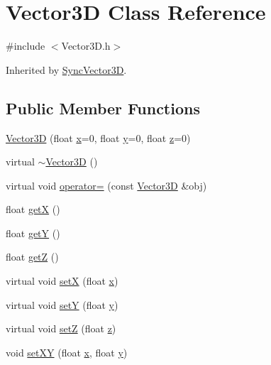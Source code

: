 \hypertarget{class_vector3_d}{}\section{Vector3\+D Class Reference}
\label{class_vector3_d}


{\ttfamily \#include $<$Vector3\+D.\+h$>$}



Inherited by \hyperlink{class_sync_vector3_d}{Sync\+Vector3\+D}.

\subsection*{Public Member Functions}
\begin{DoxyCompactItemize}
\item 
\hyperlink{class_vector3_d_a2716997bbfe6f8ef2a7d6714f60295e5}{Vector3\+D} (float \hyperlink{class_vector3_d_aca5d15bdb846448e3cb73b072783f329}{x}=0, float \hyperlink{class_vector3_d_a9b6d194fcf526d7d4f9e902421285e94}{y}=0, float \hyperlink{class_vector3_d_af9728f1eba23b9ee091755346214f391}{z}=0)
\item 
virtual \hyperlink{class_vector3_d_ae4fde5759270bf5bcf615f12f0823a8c}{$\sim$\+Vector3\+D} ()
\item 
virtual void \hyperlink{class_vector3_d_a235d1179c738481646a9bb3163126772}{operator=} (const \hyperlink{class_vector3_d}{Vector3\+D} \&obj)
\item 
float \hyperlink{class_vector3_d_af3d8e02a27e13d31831a3329402548c2}{get\+X} ()
\item 
float \hyperlink{class_vector3_d_abcffa21ac0e55556ff519ef521f6fbc0}{get\+Y} ()
\item 
float \hyperlink{class_vector3_d_a5f54a4dc4864266c310949f9fe53df81}{get\+Z} ()
\item 
virtual void \hyperlink{class_vector3_d_ac3904b095a2440b9067effc640cf7e5e}{set\+X} (float \hyperlink{class_vector3_d_aca5d15bdb846448e3cb73b072783f329}{x})
\item 
virtual void \hyperlink{class_vector3_d_a4672b17cd2a364928149b689958e273d}{set\+Y} (float \hyperlink{class_vector3_d_a9b6d194fcf526d7d4f9e902421285e94}{y})
\item 
virtual void \hyperlink{class_vector3_d_a2433f43f72a29a8b330ca6ef346eb6ab}{set\+Z} (float \hyperlink{class_vector3_d_af9728f1eba23b9ee091755346214f391}{z})
\item 
void \hyperlink{class_vector3_d_a5d95bd96475b28f6f0a1f4206400bddf}{set\+X\+Y} (float \hyperlink{class_vector3_d_aca5d15bdb846448e3cb73b072783f329}{x}, float \hyperlink{class_vector3_d_a9b6d194fcf526d7d4f9e902421285e94}{y})

\end{DoxyCompactItemize}
